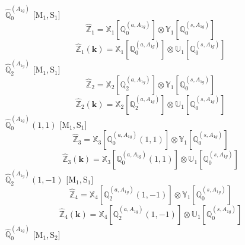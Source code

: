 \documentclass[fleqn,10pt,landscape]{article}
\begin{document}
\begin{itemize}
\vspace{4mm}
\noindent {} $\,\,\,\hat{\mathbb{Q}}_{0}^{(A_{1g})}$ [M$_{1}$,\,S$_{1}$]
\begin{dmath*}
\hat{\mathbb{Z}}_{1}=\mathbb{X}_{1}[\mathbb{Q}_{0}^{(a,A_{1g})}] \otimes\mathbb{Y}_{1}[\mathbb{Q}_{0}^{(s,A_{1g})}]
\end{dmath*}
\begin{dmath*}
\hat{\mathbb{Z}}_{1}(\bm{k})=\mathbb{X}_{1}[\mathbb{Q}_{0}^{(a,A_{1g})}] \otimes\mathbb{U}_{1}[\mathbb{Q}_{0}^{(s,A_{1g})}]
\end{dmath*}
\vspace{4mm}
\noindent {} $\,\,\,\hat{\mathbb{Q}}_{2}^{(A_{1g})}$ [M$_{1}$,\,S$_{1}$]
\begin{dmath*}
\hat{\mathbb{Z}}_{2}=\mathbb{X}_{2}[\mathbb{Q}_{2}^{(a,A_{1g})}] \otimes\mathbb{Y}_{1}[\mathbb{Q}_{0}^{(s,A_{1g})}]
\end{dmath*}
\begin{dmath*}
\hat{\mathbb{Z}}_{2}(\bm{k})=\mathbb{X}_{2}[\mathbb{Q}_{2}^{(a,A_{1g})}] \otimes\mathbb{U}_{1}[\mathbb{Q}_{0}^{(s,A_{1g})}]
\end{dmath*}
\vspace{4mm}
\noindent {} $\,\,\,\hat{\mathbb{Q}}_{0}^{(A_{1g})}(1,1)$ [M$_{1}$,\,S$_{1}$]
\begin{dmath*}
\hat{\mathbb{Z}}_{3}=\mathbb{X}_{3}[\mathbb{Q}_{0}^{(a,A_{1g})}(1,1)] \otimes\mathbb{Y}_{1}[\mathbb{Q}_{0}^{(s,A_{1g})}]
\end{dmath*}
\begin{dmath*}
\hat{\mathbb{Z}}_{3}(\bm{k})=\mathbb{X}_{3}[\mathbb{Q}_{0}^{(a,A_{1g})}(1,1)] \otimes\mathbb{U}_{1}[\mathbb{Q}_{0}^{(s,A_{1g})}]
\end{dmath*}
\vspace{4mm}
\noindent {} $\,\,\,\hat{\mathbb{Q}}_{2}^{(A_{1g})}(1,-1)$ [M$_{1}$,\,S$_{1}$]
\begin{dmath*}
\hat{\mathbb{Z}}_{4}=\mathbb{X}_{4}[\mathbb{Q}_{2}^{(a,A_{1g})}(1,-1)] \otimes\mathbb{Y}_{1}[\mathbb{Q}_{0}^{(s,A_{1g})}]
\end{dmath*}
\begin{dmath*}
\hat{\mathbb{Z}}_{4}(\bm{k})=\mathbb{X}_{4}[\mathbb{Q}_{2}^{(a,A_{1g})}(1,-1)] \otimes\mathbb{U}_{1}[\mathbb{Q}_{0}^{(s,A_{1g})}]
\end{dmath*}
\vspace{4mm}
\noindent {} $\,\,\,\hat{\mathbb{Q}}_{0}^{(A_{1g})}$ [M$_{1}$,\,S$_{2}$]
\begin{dmath*}

\end{dmath*}
\end{itemize}
\end{document}
